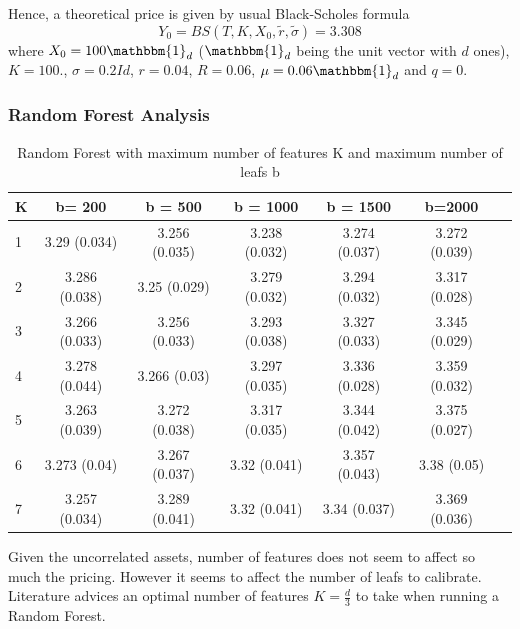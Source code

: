 \documentclass[english,11pt,openany]{report}
\theoremstyle{definition}
\theoremstyle{plain}
\theoremstyle{definition}
\begin{document}
Hence, a theoretical price is given by usual Black-Scholes formula 
\begin{displaymath}
 Y_0 = BS(T, K, X_0, \tilde{r}, \tilde{\sigma}) = 3.308
\end{displaymath}
where  $X_0 = 100 \mathbbm{1}_d$ ($\mathbbm{1}_d$ being the unit vector with $d$ ones), $K=100.$, $\sigma=0.2Id$, $r=0.04$, $R=0.06$, $\mu = 0.06\mathbbm{1}_d$ and $q = 0$. 

\subsubsection{Random Forest Analysis}

\begin{table}[H]
	\centering
	
	\begin{tabular}{|l|c|c|c|c|c|c|}\hline
		K & b= 200   & b = 500 & b = 1000  & b = 1500   & b=2000    \\ \hline
		1   & 3.29 (0.034)  & 3.256 (0.035) & 3.238 (0.032) & 3.274 (0.037) & 3.272 (0.039)       \\ \hline
		2   & 3.286 (0.038) & 3.25 (0.029)  & 3.279 (0.032) & 3.294 (0.032) & 3.317 (0.028)   \\ \hline
		3     & 3.266 (0.033) & 3.256 (0.033) & 3.293 (0.038) & 3.327 (0.033) & 3.345 (0.029)  \\ \hline
		4  & 3.278 (0.044) & 3.266 (0.03)  & 3.297 (0.035) & 3.336 (0.028) & 3.359 (0.032) \\ \hline
		5  & 3.263 (0.039) & 3.272 (0.038) & 3.317 (0.035) & 3.344 (0.042) & 3.375 (0.027)  \\  \hline
		6 & 3.273 (0.04)  & 3.267 (0.037) & 3.32 (0.041)  & 3.357 (0.043) & 3.38 (0.05)   \\\hline
		7 & 3.257 (0.034) & 3.289 (0.041) & 3.32 (0.041)  & 3.34 (0.037)  & 3.369 (0.036) \\\hline
		\hline
		
	\end{tabular}
\caption{Random Forest with maximum number of features K and maximum number of leafs b}
\label{table:high_dim_rf_feat_leafs}
\end{table}

Given the uncorrelated assets, number of features does not seem to affect so much the pricing. However it seems to affect the number of leafs to calibrate. 
Literature \cite{glouppe:rf} advices an optimal number of features $K=\frac{d}{3}$ to take when running a Random Forest.  
\end{document}
